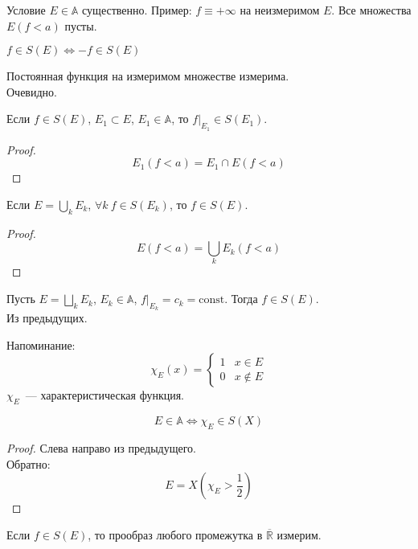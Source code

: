 \documentclass{article}
\begin{document}
    \begin{remark}
        Условие $E\in\mathbb A$ существенно. Пример: $f\equiv+\infty$ на неизмеримом $E$. Все множества $E(f<a)$ пусты.
    \end{remark}
    \begin{property}
        $f\in S(E)\Leftrightarrow -f\in S(E)$
    \end{property}
    \begin{property}
        Постоянная функция на измеримом множестве измерима.\\
        Очевидно.
    \end{property}
    \begin{property}
        Если $f\in S(E)$, $E_1\subset E$, $E_1\in\mathbb A$, то $f\big|_{E_1}\in S(E_1)$.
    \end{property}
    \begin{proof}
        $$E_1(f<a)=E_1\cap E(f<a)$$
    \end{proof}
    \begin{property}
        Если $E=\bigcup\limits_kE_k$, $\forall k~f\in S(E_k)$, то $f\in S(E)$.
    \end{property}
    \begin{proof}
        $$
        E(f<a)=\bigcup\limits_k E_k(f<a)
        $$
    \end{proof}
    \begin{property}
        Пусть $E=\bigsqcup\limits_kE_k$, $E_k\in\mathbb A$, $f\big|_{E_k}=c_k=\mathrm{const}$. Тогда $f\in S(E)$.\\
        Из предыдущих.
    \end{property}
    \begin{remark}
        Напоминание:
        $$\chi_E(x)=\begin{cases}
            1 & x\in E\\
            0 & x\notin E
        \end{cases}$$
        $\chi_E$~--- характеристическая функция.
    \end{remark}
    \begin{property}
        $$E\in\mathbb A\Leftrightarrow\chi_E\in S(X)$$
    \end{property}
    \begin{proof}
        Слева направо из предыдущего.\\
        Обратно:
        $$
        E=X\left(\chi_E>\frac12\right)
        $$
    \end{proof}
    \begin{property}
        Если $f\in S(E)$, то прообраз любого промежутка в $\overline{\mathbb R}$ измерим.
    \end{property}
\end{document}
